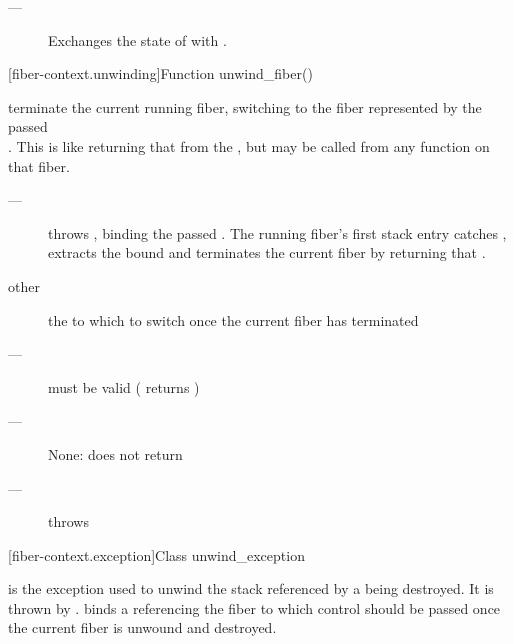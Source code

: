 
\effects
\begin{description}
    \item[---] Exchanges the state of  with .
\end{description}

[fiber-context.unwinding]{Function unwind\_fiber()}


\effects
terminate the current running fiber, switching to the fiber represented by
the passed\\\fiber. This is like returning that \fiber from the \entryfn, but may
be called from any function on that fiber.

\remarks
\begin{description}
    \item[---] throws \unwindex, binding the passed \fiber. The running fiber's
              first stack entry catches \unwindex, extracts the bound \fiber
              and terminates the current fiber by returning that \fiber.
\end{description}

\params
\begin{description}
    \item[other] the \fiber to which to switch once the current fiber has terminated
\end{description}

\requires
\begin{description}
    \item[---]  must be valid ( returns )
\end{description}

\returns
\begin{description}
    \item[---] None: \unwindfib does not return
\end{description}

\except
\begin{description}
    \item[---] throws \unwindex
\end{description}


[fiber-context.exception]{Class unwind\_exception}


is the exception used to unwind the stack referenced by a \fiber being destroyed.
It is thrown by \unwindfib. \unwindex binds a \fiber referencing the fiber to
which control should be passed once the current fiber is unwound and destroyed.
